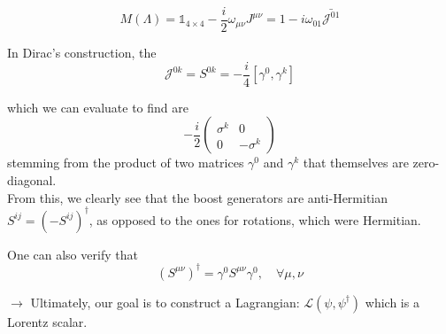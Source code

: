 \documentclass[11pt]{article}
\newcommand{\lag}{\mathcal{L}}
\begin{document}
	 	 \[ M(\Lambda) = \mathbb{1}_{4\times 4} - \frac{i}{2} \omega_{\mu\nu} J^{\mu\nu} = 1-i\omega_{01} \bar{\mathcal{J}^{01}} \]
	 	 
	 	 In Dirac's construction, the $$\mathcal{J}^{0k} = S^{0k}  = -\frac{i}{4}[\gamma^0, \gamma^k]$$
	 	 
	 	 which we can evaluate to find are $$ -\frac{i}{2}\begin{pmatrix}
	 	 	\sigma^k & 0 \\ 0 & -\sigma^k
	 	 \end{pmatrix}$$
	 	stemming from the product of two matrices $\gamma^0$ and $\gamma^k$ that themselves are zero-diagonal.\\
	 	
	 	From this, we clearly see that the boost generators are anti-Hermitian $S^{ij} = (-S^{ij})^\dagger$, as opposed to the ones for rotations, which were Hermitian.
	 	
	 	One can also verify that $$ (S^{\mu\nu})^\dagger = \gamma^0 S^{\mu\nu} \gamma^0, \quad \forall \mu, \nu$$
	 	
	 	{\color{red}$\rightarrow$} Ultimately, our goal is to construct a Lagrangian: $ \lag (\psi, \psi^\dagger)$ which is a Lorentz scalar.
\end{document}
